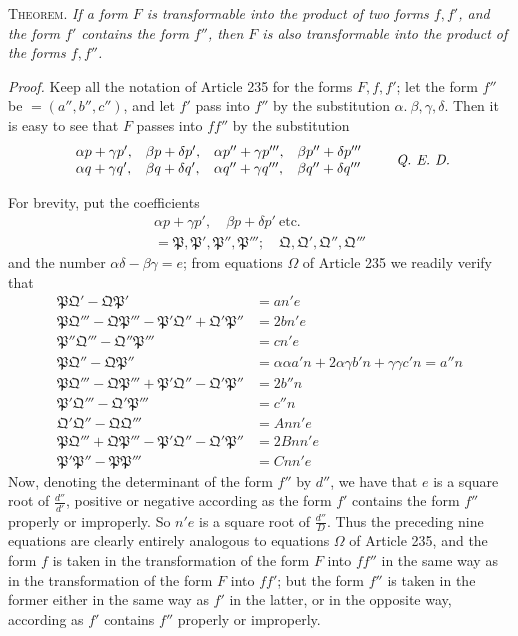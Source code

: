 \textsc{Theorem.} \textit{If a form $F$ is transformable into the product of two forms $f,f'$, and the form $f'$ contains the form $f''$, then $F$ is also transformable into the product of the forms $f,f''$.}

\textit{Proof.} Keep all the notation of Article 235 for the forms $F,f,f'$; let the form $f''$ be $=(a'',b'',c'')$, and let $f'$ pass into $f''$ by the substitution $\alpha.\ \beta,\gamma,\delta$. Then it is easy to see that $F$ passes into $ff''$ by the substitution
\[
\begin{array}{llll}
\alpha p+\gamma p',&\beta p+\delta p',&\alpha p''+\gamma p''',&\beta p''+\delta p'''\\
\alpha q+\gamma q',&\beta q+\delta q',&\alpha q''+\gamma q''',&\beta q''+\delta q'''
\end{array}
\qquad\text{\textit{Q. E. D.}}
\]

For brevity, put the coefficients
\[
\begin{gathered}\alpha p+\gamma p',\quad\beta p+\delta p'\ \text{etc.}\\=\mathfrak{P},\mathfrak{P}',\mathfrak{P}'',\mathfrak{P}''';\quad\mathfrak{Q},\mathfrak{Q}',\mathfrak{Q}'',\mathfrak{Q}'''\end{gathered}
\]
and the number $\alpha\delta-\beta\gamma=e$; from equations $\Omega$ of Article 235 we readily verify that
\[
\begin{aligned}
\mathfrak{P}\mathfrak{Q}'-\mathfrak{Q}\mathfrak{P}'&=an'e\\
\mathfrak{P}\mathfrak{Q}'''-\mathfrak{Q}\mathfrak{P}'''-\mathfrak{P}'\mathfrak{Q}''+\mathfrak{Q}'\mathfrak{P}''&=2bn'e\\
\mathfrak{P}''\mathfrak{Q}'''-\mathfrak{Q}''\mathfrak{P}'''&=cn'e\\
\mathfrak{P}\mathfrak{Q}''-\mathfrak{Q}\mathfrak{P}''&=\alpha\alpha a'n+2\alpha\gamma b'n+\gamma\gamma c'n=a''n\\
\mathfrak{P}\mathfrak{Q}'''-\mathfrak{Q}\mathfrak{P}'''+\mathfrak{P}'\mathfrak{Q}''-\mathfrak{Q}'\mathfrak{P}''&=2b''n\\
\mathfrak{P}'\mathfrak{Q}'''-\mathfrak{Q}'\mathfrak{P}'''&=c''n\\
\mathfrak{Q}'\mathfrak{Q}''-\mathfrak{Q}\mathfrak{Q}'''&=Ann'e\\
\mathfrak{P}\mathfrak{Q}'''+\mathfrak{Q}\mathfrak{P}'''-\mathfrak{P}'\mathfrak{Q}''-\mathfrak{Q}'\mathfrak{P}''&=2Bnn'e\\
\mathfrak{P}'\mathfrak{P}''-\mathfrak{P}\mathfrak{P}'''&=Cnn'e
\end{aligned}
\]
Now, denoting the determinant of the form $f''$ by $d''$, we have that $e$ is a square root of $\frac{d''}{d'}$, positive or negative according as the form $f'$ contains the form $f''$ properly or improperly. So $n'e$ is a square root of $\frac{d''}{D}$. Thus the preceding nine equations are clearly entirely analogous to equations $\Omega$ of Article 235, and the form $f$ is taken in the transformation of the form $F$ into $ff''$ in the same way as in the transformation of the form $F$ into $ff'$; but the form $f''$ is taken in the former either in the same way as $f'$ in the latter, or in the opposite way, according as $f'$ contains $f''$ properly or improperly.

